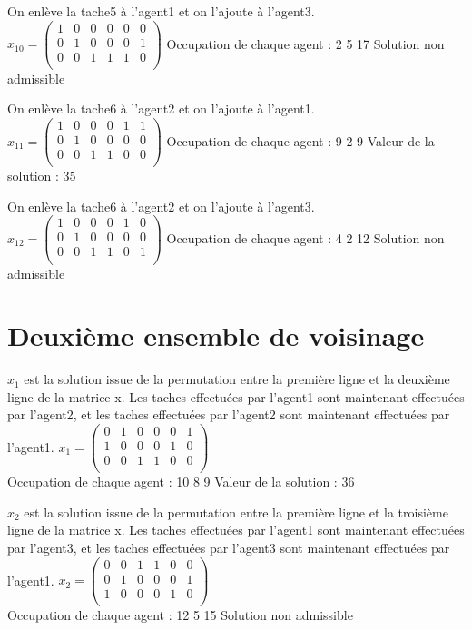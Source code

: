 \documentclass[a4paper,12pt,titlepage]{report}
\begin{document}
On enlève la tache5 à l'agent1 et on l'ajoute à l'agent3.
$x_{10} = \begin{pmatrix}
 1&0&0&0&0&0 \\
 0&1&0&0&0&1 \\
 0&0&1&1&1&0 \\
\end{pmatrix}$
Occupation de chaque agent : 2 5 17
Solution non admissible

On enlève la tache6 à l'agent2 et on l'ajoute à l'agent1.
$x_{11} = \begin{pmatrix}
 1&0&0&0&1&1 \\
 0&1&0&0&0&0 \\
 0&0&1&1&0&0 \\
\end{pmatrix}$
Occupation de chaque agent : 9 2 9
Valeur de la solution : 35

On enlève la tache6 à l'agent2 et on l'ajoute à l'agent3.
$x_{12} = \begin{pmatrix}
 1&0&0&0&1&0 \\
 0&1&0&0&0&0 \\
 0&0&1&1&0&1 \\
\end{pmatrix}$
Occupation de chaque agent : 4 2 12
Solution non admissible

\section{Deuxième ensemble de voisinage}

$x_{1}$ est la solution issue de la permutation entre la première ligne et la deuxième ligne de la matrice x. Les taches effectuées par l'agent1 sont maintenant effectuées par l'agent2, et les taches effectuées par l'agent2 sont maintenant effectuées par l'agent1.
$x_{1} = \begin{pmatrix}
 0&1&0&0&0&1 \\
 1&0&0&0&1&0 \\
 0&0&1&1&0&0 \\
\end{pmatrix}$\\
Occupation de chaque agent : 10 8 9
Valeur de la solution : 36

$x_{2}$ est la solution issue de la permutation entre la première ligne et la troisième ligne de la matrice x. Les taches effectuées par l'agent1 sont maintenant effectuées par l'agent3, et les taches effectuées par l'agent3 sont maintenant effectuées par l'agent1.
$x_{2} = \begin{pmatrix}
 0&0&1&1&0&0 \\
 0&1&0&0&0&1 \\
 1&0&0&0&1&0 \\
\end{pmatrix}$\\
Occupation de chaque agent : 12 5 15
Solution non admissible
\end{document}
